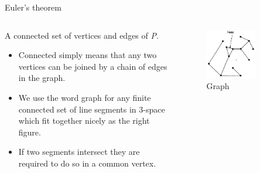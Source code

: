 \documentclass{beamer}
\begin{document}
\begin{frame}{Euler's theorem}
  \begin{columns}
    \begin{column}{0.5\textwidth}
      \begin{definition}[Graph]
        A connected set of vertices and edges of \textsl{P}.
        \begin{itemize}
        \item Connected simply means that any two vertices can be joined by a chain of edges in the graph.
        \item We use the word graph for any finite connected set of line segments in 3-space which fit together nicely as the right figure.
        \item If two segments intersect they are required to do so in a common vertex.
        \end{itemize}
      \end{definition}
    \end{column}
    \begin{column}{0.5\textwidth}
      \begin{figure}
        \centering
        \includegraphics[width=0.7\textwidth]{figure_1_4_b.png}
        \caption{Graph}
      \end{figure}
    \end{column}
  \end{columns}
\end{frame}
\end{document}
